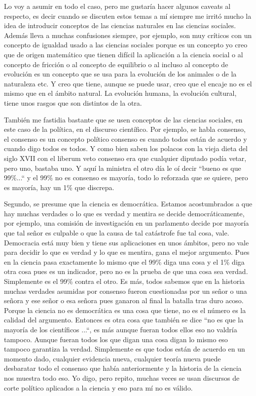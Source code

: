 Lo voy a asumir en todo el caso, pero me gustaría hacer algunos caveats al respecto, es decir cuando se discuten estos temas a mí siempre me irritó mucho la idea de introducir conceptos de las ciencias naturales en las ciencias sociales. Además lleva a muchas confusiones siempre, por ejemplo, son muy críticos con un concepto de igualdad usado a las ciencias sociales porque es un concepto yo creo que de origen matemático que tienen difícil la aplicación a la ciencia social o al concepto de fricción o al concepto de equilibrio o al incluso al concepto de evolución es un concepto que se usa para la evolución de los animales o de la naturaleza etc. Y creo que tiene, aunque se puede usar, creo que el encaje no es el mismo que en el ámbito natural. La evolución humana, la evolución cultural, tiene unos rasgos que son distintos de la otra.

También me fastidia bastante que se usen conceptos de las ciencias sociales, en este caso de la política, en el discurso científico. Por ejemplo, se habla consenso, el consenso es un concepto político consenso es cuando todos están de acuerdo y cuando digo todos es todos. Y como bien saben los polacos con la vieja dieta del siglo XVII con el liberum veto consenso era que cualquier diputado podía vetar, pero uno, bastaba uno. Y aquí la ministra el otro día le oí decir ``bueno es que 99\%...`` y el 99\% no es consenso es mayoría, todo lo reforzada que se quiere, pero es mayoría, hay un 1\% que discrepa.

Segundo, se presume que la ciencia es democrática. Estamos acostumbrados a que hay muchas verdades o lo que es verdad y mentira se decide democráticamente, por ejemplo, una comisión de investigación en un parlamento decide por mayoría que tal señor es culpable o que la causa de tal catástrofe fue tal cosa, vale. Democracia está muy bien y tiene sus aplicaciones en unos ámbitos, pero no vale para decidir lo que es verdad y lo que es mentira, gana el mejor argumento. Pues en la ciencia pasa exactamente lo mismo que el 99\% diga una cosa y el 1\% diga otra cosa pues es un indicador, pero no es la prueba de que una cosa sea verdad. Simplemente es el 99\% contra el otro. Es más, todos sabemos que en la historia muchas verdades asumidas por consenso fueron cuestionadas por un señor o una señora y ese señor o esa señora pues ganaron al final la batalla tras duro acoso. Porque la ciencia no es democrática es una cosa que tiene, no es el número es la calidad del argumento. Entonces es otra cosa que también se dice ``no es que la mayoría de los científicos ...``, es más aunque fueran todos ellos eso no valdría tampoco. Aunque fueran todos los que digan una cosa digan lo mismo eso tampoco garantiza la verdad. Simplemente es que todos están de acuerdo en un momento dado, cualquier evidencia nueva, cualquier teoría nueva puede desbaratar todo el consenso que había anteriormente y la historia de la ciencia nos muestra todo eso. Yo digo, pero repito, muchas veces se usan discursos de corte político aplicados a la ciencia y eso para mí no es válido.

